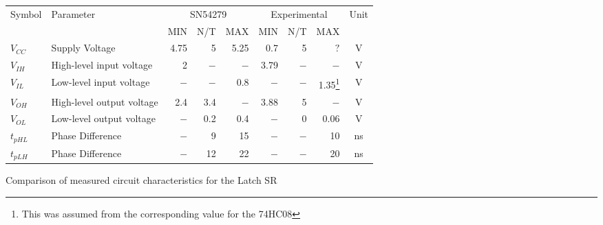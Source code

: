 \begin{tabular}{|l|l|r|r|r|r|r|r|c|}
    \toprule
    Symbol  &Parameter  &\multicolumn{3}{c|}{SN54279}&\multicolumn{3}{c|}{Experimental}&Unit\\
            &           &   MIN&N/T&MAX&MIN&N/T&MAX&\\
    \midrule
    $V_{CC}$&Supply Voltage&4.75&5&5.25&0.7&5&$?$&V\\
    $V_{IH}$&High-level input voltage&2&$-$&$-$&3.79&$-$&$-$&V\\
    $V_{IL}$&Low-level input voltage&$-$&$-$&0.8&$-$&$-$&1.35\footnote{This was assumed from the corresponding value for the 74HC08}&V\\
    \midrule
    $V_{OH}$&High-level output voltage&2.4&3.4&$-$&3.88&5&$-$&V\\
    $V_{OL}$&Low-level output voltage &$-$&0.2&0.4&$-$&0&0.06&V\\
    \midrule
    $t_{pHL}$&Phase Difference&$-$&9&15&$-$&$-$&10&ns\\
    $t_{pLH}$&Phase Difference&$-$&12&22&$-$&$-$&20&ns\\
    \bottomrule
\end{tabular}
\caption{Comparison of measured circuit characteristics for the Latch SR}